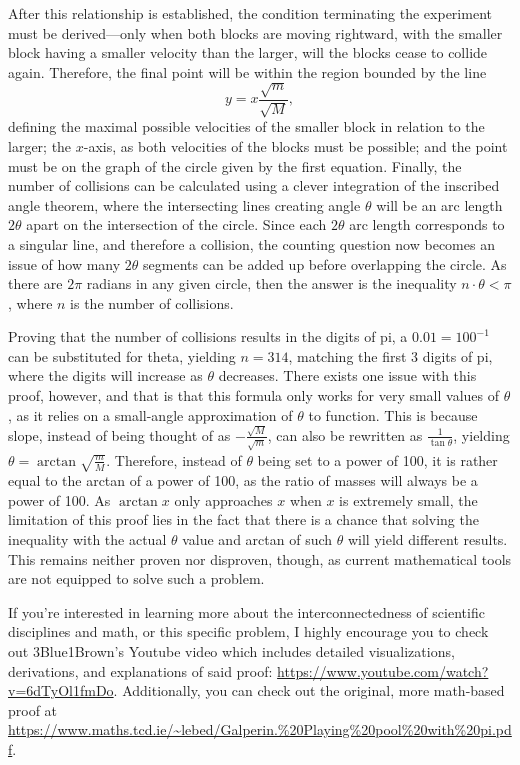 \documentclass{article}
\begin{document}
\begin{multicols}{2}
After this relationship is established, the condition terminating the experiment must be derived---only when both blocks are moving rightward, with the smaller block having a smaller velocity than the larger, will the blocks cease to collide again. Therefore, the final point will be within the region bounded by the line $$y = x\frac{\sqrt{m}}{\sqrt{M}},$$ defining the maximal possible velocities of the smaller block in relation to the larger; the $x$-axis, as both velocities of the blocks must be possible; and the point must be on the graph of the circle given by the first equation. Finally, the number of collisions can be calculated using a clever integration of the inscribed angle theorem, where the intersecting lines creating angle $\theta$ will be an arc length $2\theta$ apart on the intersection of the circle. Since each $2\theta$ arc length corresponds to a singular line, and therefore a collision, the counting question now becomes an issue of how many $2\theta$ segments can be added up before overlapping the circle. As there are $2\pi$ radians in any given circle, then the answer is the inequality $n \cdot \theta < \pi$, where $n$ is the number of collisions.

Proving that the number of collisions results in the digits of pi, a $0.01 = 100^{-1}$ can be substituted for theta, yielding $n=314$, matching the first 3 digits of pi, where the digits will increase as $\theta$ decreases. There exists one issue with this proof, however, and that is that this formula only works for very small values of $\theta$, as it relies on a small-angle approximation of $\theta$ to function. This is because slope, instead of being thought of as $-\frac{\sqrt{M}}{\sqrt{m}}$, can also be rewritten as $\frac{1}{\tan{\theta}}$, yielding $\theta = \arctan{\sqrt{\frac{m}{M}}}$. Therefore, instead of $\theta$ being set to a power of 100, it is rather equal to the arctan of a power of 100, as the ratio of masses will always be a power of 100. As $\arctan{x}$ only approaches $x$ when $x$ is extremely small, the limitation of this proof lies in the fact that there is a chance that solving the inequality with the actual $\theta$ value and arctan of such $\theta$ will yield different results. This remains neither proven nor disproven, though, as current mathematical tools are not equipped to solve such a problem.

If you’re interested in learning more about the interconnectedness of scientific disciplines and math, or this specific problem, I highly encourage you to check out 3Blue1Brown’s Youtube video which includes detailed visualizations, derivations, and explanations of said proof: \url{https://www.youtube.com/watch?v=6dTyOl1fmDo}.
Additionally, you can check out the original, more math-based proof at
\url{https://www.maths.tcd.ie/~lebed/Galperin.%20Playing%20pool%20with%20pi.pdf}.

\end{multicols}


\end{document}
